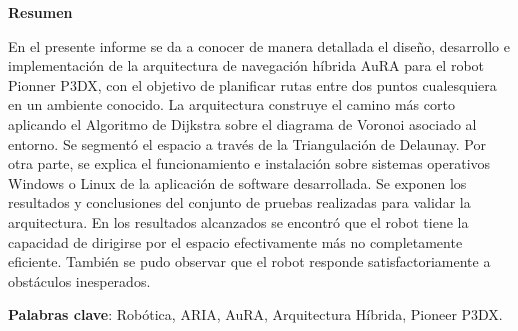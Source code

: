 \documentclass[11pt,twoside,A5]{article}
\begin{document}
\maketitle 
\fancyhead{} 
\fancyfoot{}
\fancyfoot[RO,LE]{\thepage}

\begin{center}
{\bf\small Resumen}

\vspace{-3mm} \hspace{.05in}\parbox{4.5in} {{\small %

En el presente informe se da a conocer de manera detallada el diseño, desarrollo e implementación 
de la arquitectura de navegación híbrida AuRA para el robot Pionner P3DX, 
con el objetivo de planificar rutas entre dos puntos cualesquiera en un ambiente conocido.
La arquitectura construye el camino más corto aplicando el Algoritmo de Dijkstra sobre el diagrama de Voronoi asociado
al entorno. Se segmentó el espacio a través de la Triangulación de Delaunay.
Por otra parte, se explica el funcionamiento e instalación sobre sistemas operativos Windows o Linux de la aplicación de software 
desarrollada. Se exponen los resultados y conclusiones del conjunto de pruebas 
realizadas para validar la arquitectura. En los resultados alcanzados se encontró 
que el robot tiene la capacidad de dirigirse por el espacio efectivamente más no completamente eficiente. 
También se pudo observar que el robot responde satisfactoriamente a obstáculos inesperados. 

 \textbf{Palabras clave}: Robótica, ARIA, AuRA, Arquitectura Híbrida, Pioneer P3DX.}}
\end{center}
\pagebreak
\end{document}
